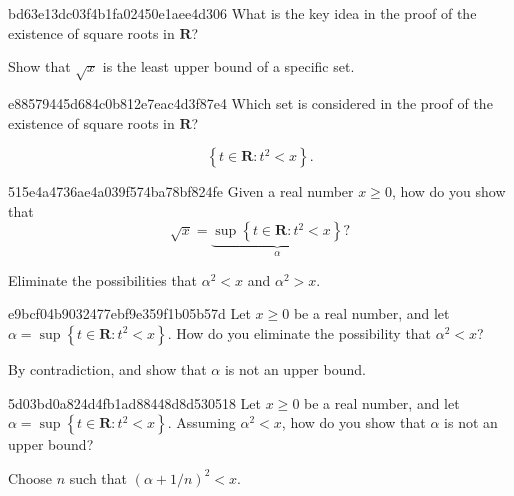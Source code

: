 \begin{note}{bd63e13dc03f4b1fa02450e1aee4d306}
    What is the key idea in the proof of the existence of square roots in \({ \mathbf{R} }\)?

    \begin{cloze}{1}
        Show that \({ \sqrt{x} }\) is the least upper bound of a specific set.
    \end{cloze}
\end{note}

\begin{note}{e88579445d684c0b812e7eac4d3f87e4}
    Which set is considered in the proof of the existence of square roots in \({ \mathbf{R} }\)?

    \begin{cloze}{1}
        \[
            \left\{ t \in \mathbf{R} : t^2 < x \right\}.
        \]
    \end{cloze}
\end{note}

\begin{note}{515e4a4736ae4a039f574ba78bf824fe}
    Given a real number \({ x \geq 0 }\), how do you show that
    \[
        \sqrt{x} = \underbrace{\sup \left\{ t \in \mathbf{R} : t^2 < x \right\}}_{\alpha}?
    \]

    \begin{cloze}{1}
        Eliminate the possibilities that \({ \alpha^2 < x }\) and \({ \alpha^2 > x }\).
    \end{cloze}
\end{note}

\begin{note}{e9bcf04b9032477ebf9e359f1b05b57d}
    Let \({ x \geq 0 }\) be a real number, and let \({ \alpha = \sup \left\{ t \in \mathbf{R} : t^2 < x \right\} }\).
    How do you eliminate the possibility that \({ \alpha^2 < x }\)?

    \begin{cloze}{1}
        By contradiction, and show that \({ \alpha }\) is not an upper bound.
    \end{cloze}
\end{note}

\begin{note}{5d03bd0a824d4fb1ad88448d8d530518}
    Let \({ x \geq 0 }\) be a real number, and let \({ \alpha = \sup \left\{ t \in \mathbf{R} : t^2 < x \right\} }\).
    Assuming \({ \alpha^2 < x }\), how do you show that \({ \alpha }\) is not an upper bound?

    \begin{cloze}{1}
        Choose \({ n }\) such that \({ \left( \alpha + 1/n \right)^2 < x }\).
    \end{cloze}
\end{note}

